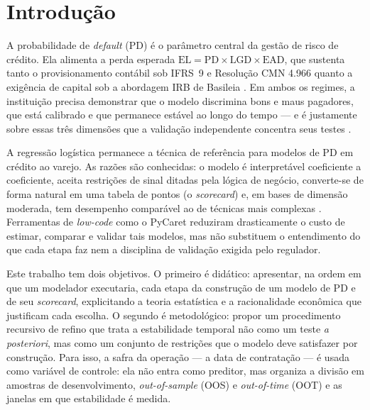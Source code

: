 \documentclass[11pt,a4paper]{article}
\newcommand{\pd}{\mathrm{PD}}
\begin{document}
\tableofcontents
\newpage

\section{Introdução}
\label{sec:intro}

A probabilidade de \emph{default} (PD) é o parâmetro central da gestão de risco de crédito. Ela alimenta a perda esperada $\mathrm{EL} = \pd \times \mathrm{LGD} \times \mathrm{EAD}$, que sustenta tanto o provisionamento contábil sob IFRS~9 e Resolução CMN 4.966 \citep{ifrs9,cmn4966} quanto a exigência de capital sob a abordagem IRB de Basileia \citep{bcbs2006,gordy2003,bcb3648}. Em ambos os regimes, a instituição precisa demonstrar que o modelo discrimina bons e maus pagadores, que está calibrado e que permanece estável ao longo do tempo --- e é justamente sobre essas três dimensões que a validação independente concentra seus testes \citep{bcbs2005,sr117}.

A regressão logística permanece a técnica de referência para modelos de PD em crédito ao varejo. As razões são conhecidas: o modelo é interpretável coeficiente a coeficiente, aceita restrições de sinal ditadas pela lógica de negócio, converte-se de forma natural em uma tabela de pontos (o \emph{scorecard}) e, em bases de dimensão moderada, tem desempenho comparável ao de técnicas mais complexas \citep{hand1997,lessmann2015,thomas2002,siddiqi2017}. Ferramentas de \emph{low-code} como o PyCaret \citep{pycaret} reduziram drasticamente o custo de estimar, comparar e validar tais modelos, mas não substituem o entendimento do que cada etapa faz nem a disciplina de validação exigida pelo regulador.

Este trabalho tem dois objetivos. O primeiro é didático: apresentar, na ordem em que um modelador executaria, cada etapa da construção de um modelo de PD e de seu \emph{scorecard}, explicitando a teoria estatística e a racionalidade econômica que justificam cada escolha. O segundo é metodológico: propor um procedimento recursivo de refino que trata a estabilidade temporal não como um teste \emph{a posteriori}, mas como um conjunto de restrições que o modelo deve satisfazer por construção. Para isso, a safra da operação --- a data de contratação --- é usada como variável de controle: ela não entra como preditor, mas organiza a divisão em amostras de desenvolvimento, \emph{out-of-sample} (OOS) e \emph{out-of-time} (OOT) e as janelas em que estabilidade é medida.
\end{document}
